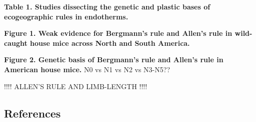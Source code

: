 \documentclass[]{article}
\begin{document}
\textbf{Table 1. Studies dissecting the genetic and plastic bases of
ecogeographic rules in endotherms.}

\newpage

\textbf{Figure 1. Weak evidence for Bergmann's rule and Allen's rule in
wild-caught house mice across North and South America.}

\newpage

\textbf{Figure 2. Genetic basis of Bergmann's rule and Allen's rule in
American house mice.} N0 vs N1 vs N2 vs N3-N5??

!!!! ALLEN'S RULE AND LIMB-LENGTH !!!!

\newpage

\hypertarget{references}{%
\subsection{References}\label{references}}
\end{document}
